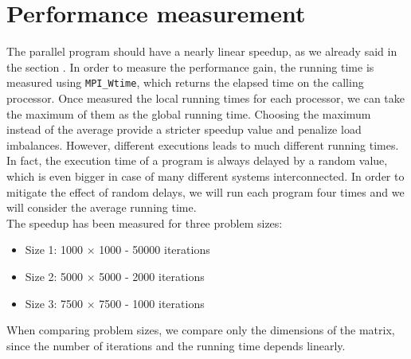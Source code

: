 \documentclass{article}
\begin{document}
\section{Performance measurement}
The parallel program should have a nearly linear speedup, as we already said in the section . In order to measure the performance gain, the running time is measured using \texttt{MPI\_Wtime}, which returns the elapsed time on the calling processor. Once measured the local running times for each processor, we can take the maximum of them as the global running time. Choosing the maximum instead of the average provide a stricter speedup value and penalize load imbalances. However, different executions leads to much different running times. In fact, the execution time of a program is always delayed by a random value, which is even bigger in case of many different systems interconnected. In order to mitigate the effect of random delays, we will run each program four times and we will consider the average running time. \\
The speedup has been measured for three problem sizes:
\begin{itemize}
    \item Size 1: 1000 $\times$ 1000 - 50000 iterations
    \item Size 2: 5000 $\times$ 5000 - 2000 iterations
    \item Size 3: 7500 $\times$ 7500 - 1000 iterations
\end{itemize}
When comparing problem sizes, we compare only the dimensions of the matrix, since the number of iterations and the running time depends linearly. \\
\end{document}
